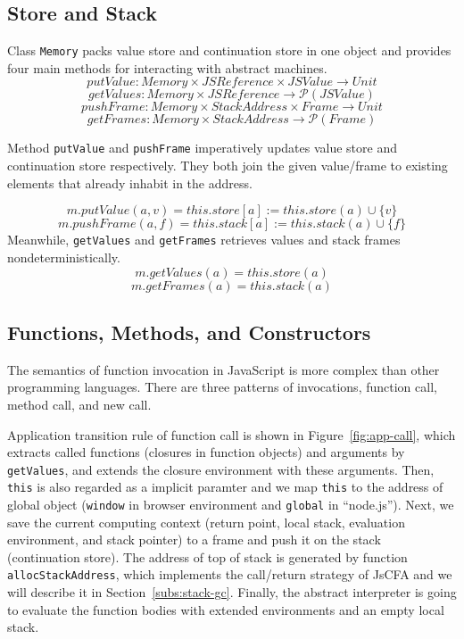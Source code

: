 \documentclass{article}
\begin{document}
\subsection{Store and Stack}
\label{sub:Store and Stack}

Class \verb|Memory| packs value store and continuation store in one object and provides four main methods for interacting with abstract machines.
\[
putValue: Memory \times JSReference \times JSValue \to Unit
\]
\[
getValues: Memory \times JSReference \to \mathcal{P}(JSValue)
\]
\[
pushFrame: Memory \times StackAddress \times Frame \to Unit
\]
\[
getFrames: Memory \times StackAddress \to \mathcal{P}(Frame)
\]

Method \verb|putValue| and \verb|pushFrame| imperatively updates value store and continuation store respectively.
They both join the given value/frame to existing elements that already inhabit in the address.

\[
m.putValue(a, v) = this.store[a] := this.store(a) \cup \{v\}
\]
\[
m.pushFrame(a, f) = this.stack[a] := this.stack(a) \cup \{f\}
\]
Meanwhile, \verb|getValues| and \verb|getFrames| retrieves values and stack frames nondeterministically.
\[
m.getValues(a) = this.store(a)
\]
\[
m.getFrames(a) = this.stack(a)
\]

\subsection{Functions, Methods, and Constructors}
\label{sub:Functions, Methods, and Constructors}

The semantics of function invocation in JavaScript is more complex than other programming languages.
There are three patterns of invocations, function call, method call, and new call.

Application transition rule of function call is shown in Figure~\ref{fig:app-call}, which extracts called functions (closures in function objects) and arguments by \verb|getValues|, and extends the closure environment with these arguments. Then, \verb|this| is also regarded as a implicit paramter and we map \verb|this| to the address of global object (\verb|window| in browser environment and \verb|global| in ``node.js''). Next, we save the current computing context (return point, local stack, evaluation environment, and stack pointer) to a frame and push it on the stack (continuation store).
The address of top of stack is generated by function \verb|allocStackAddress|, which implements the call/return strategy of JsCFA and we will describe it in Section~\ref{subs:stack-gc}. Finally, the abstract interpreter is going to evaluate the function bodies with extended environments and an empty local stack.
\end{document}
